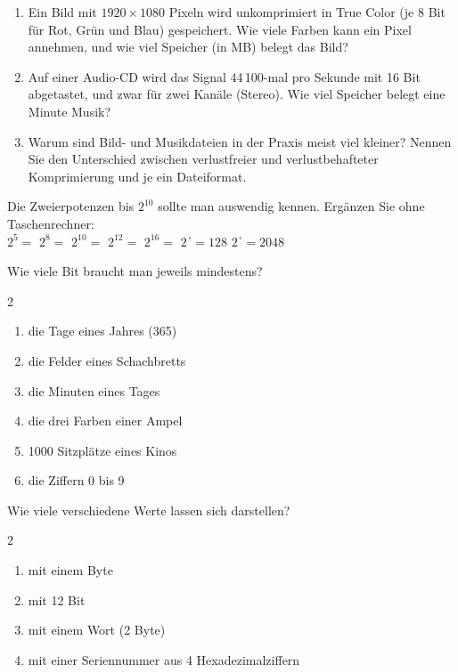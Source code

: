 \begin{enumerate}[label=\alph*)]
\item Ein Bild mit $1920 \times 1080$ Pixeln wird unkomprimiert in True Color (je 8 Bit für Rot, Grün und Blau) gespeichert. Wie viele Farben kann ein Pixel annehmen, und wie viel Speicher (in MB) belegt das Bild?
\item Auf einer Audio-CD wird das Signal 44\,100-mal pro Sekunde mit 16 Bit abgetastet, und zwar für zwei Kanäle (Stereo). Wie viel Speicher belegt eine Minute Musik?
\item Warum sind Bild- und Musikdateien in der Praxis meist viel kleiner? Nennen Sie den Unterschied zwischen verlustfreier und verlustbehafteter Komprimierung und je ein Dateiformat.
\end{enumerate}

\ueben
{}
Die Zweierpotenzen bis $2^{10}$ sollte man auswendig kennen. Ergänzen Sie ohne Taschenrechner: \\[1mm]
$2^5 = $ \luecke[1.2cm] \quad $2^8 = $ \luecke[1.2cm] \quad $2^{10} = $ \luecke[1.2cm] \quad $2^{12} = $ \luecke[1.2cm] \quad $2^{16} = $ \luecke[1.5cm] \quad $2^{\,\square} = 128$ \quad $2^{\,\square} = 2048$

Wie viele Bit braucht man jeweils mindestens?
\begin{multicols}{2}
\begin{enumerate}[label=\alph*)]
\item die Tage eines Jahres (365)
\item die Felder eines Schachbretts
\item die Minuten eines Tages
\item die drei Farben einer Ampel
\item 1000 Sitzplätze eines Kinos
\item die Ziffern 0 bis 9
\end{enumerate}
\end{multicols}

Wie viele verschiedene Werte lassen sich darstellen?
\begin{multicols}{2}
\begin{enumerate}[label=\alph*)]
\item mit einem Byte
\item mit 12 Bit
\item mit einem Wort (2 Byte)
\item mit einer Seriennummer aus 4 Hexadezimalziffern
\end{enumerate}
\end{multicols}

